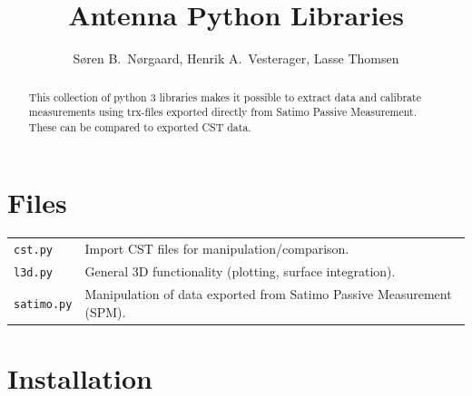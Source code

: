 \documentclass[10pt]{article}
\title{Antenna Python Libraries}
\author{Søren B.\ Nørgaard, Henrik A.\ Vesterager, Lasse Thomsen}
\begin{document}
\maketitle

\begin{abstract}
    This collection of python 3 libraries makes it possible to extract data and calibrate measurements using trx-files exported directly from Satimo Passive Measurement. These can be compared to exported CST data.
\end{abstract}

\tableofcontents


\section{Files}
\begin{tabularx}{\linewidth}{lX}
    \texttt{cst.py} & Import CST files for manipulation/comparison. \\
    \texttt{l3d.py} & General 3D functionality (plotting, surface integration). \\
    \texttt{satimo.py} & Manipulation of data exported from Satimo Passive Measurement (SPM). 
\end{tabularx}

\section{Installation}

\end{document}
